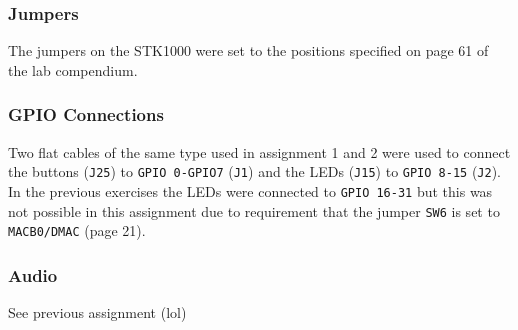 	\subsubsection{Jumpers}
		The jumpers on the STK1000 were set to the positions specified on page 61 of the lab compendium\cite{lab-compendium}.
	\subsubsection{GPIO Connections}
		Two flat cables of the same type used in assignment 1\cite{tdt4258-1} and 2\cite{tdt4258-2} were used to connect the buttons (\texttt{J25}) to \texttt{GPIO 0-GPIO7} (\texttt{J1}) and the LEDs (\texttt{J15}) to \texttt{GPIO 8-15} (\texttt{J2}).
		In the previous exercises the LEDs were connected to \texttt{GPIO 16-31} but this was not possible in this assignment due to requirement that the jumper \texttt{SW6} is set to 
		\texttt{MACB0/DMAC}\cite{lab-compendium} (page 21).
	\subsubsection{Audio}
		See previous assignment (lol)
